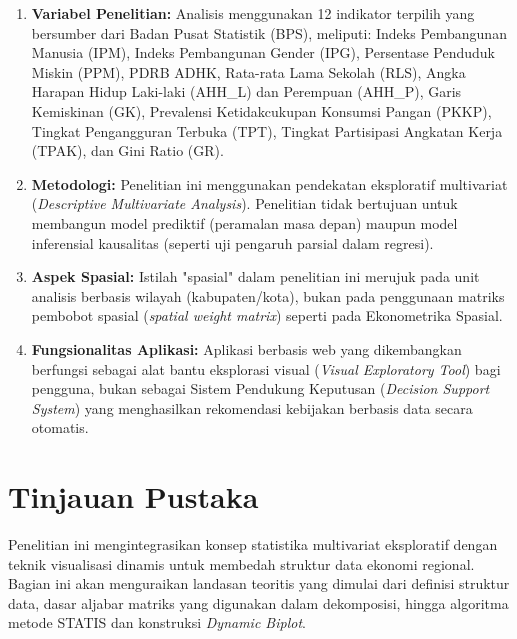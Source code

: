 \documentclass[a4paper]{article}
\theoremstyle{definition} %
\begin{document}
\begin{enumerate}
    \item \textbf{Variabel Penelitian:} Analisis menggunakan 12 indikator terpilih yang bersumber dari Badan Pusat Statistik (BPS), meliputi: Indeks Pembangunan Manusia (IPM), Indeks Pembangunan Gender (IPG), Persentase Penduduk Miskin (PPM), PDRB ADHK, Rata-rata Lama Sekolah (RLS), Angka Harapan Hidup Laki-laki (AHH\_L) dan Perempuan (AHH\_P), Garis Kemiskinan (GK), Prevalensi Ketidakcukupan Konsumsi Pangan (PKKP), Tingkat Pengangguran Terbuka (TPT), Tingkat Partisipasi Angkatan Kerja (TPAK), dan Gini Ratio (GR).
    \item \textbf{Metodologi:} Penelitian ini menggunakan pendekatan eksploratif multivariat (\textit{Descriptive Multivariate Analysis}). Penelitian tidak bertujuan untuk membangun model prediktif (peramalan masa depan) maupun model inferensial kausalitas (seperti uji pengaruh parsial dalam regresi).
    \item \textbf{Aspek Spasial:} Istilah "spasial" dalam penelitian ini merujuk pada unit analisis berbasis wilayah (kabupaten/kota), bukan pada penggunaan matriks pembobot spasial (\textit{spatial weight matrix}) seperti pada Ekonometrika Spasial.
    \item \textbf{Fungsionalitas Aplikasi:} Aplikasi berbasis web yang dikembangkan berfungsi sebagai alat bantu eksplorasi visual (\textit{Visual Exploratory Tool}) bagi pengguna, bukan sebagai Sistem Pendukung Keputusan (\textit{Decision Support System}) yang menghasilkan rekomendasi kebijakan berbasis data secara otomatis.
\end{enumerate}

\newpage
\section{Tinjauan Pustaka}

Penelitian ini mengintegrasikan konsep statistika multivariat eksploratif dengan teknik visualisasi dinamis untuk membedah struktur data ekonomi regional. Bagian ini akan menguraikan landasan teoritis yang dimulai dari definisi struktur data, dasar aljabar matriks yang digunakan dalam dekomposisi, hingga algoritma metode STATIS dan konstruksi \textit{Dynamic Biplot}.
\end{document}
